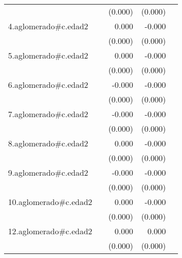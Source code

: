 {\begin{longtable}{l*{4}{D{.}{.}{-1}}}
            &                     &     (0.000)         &     (0.000)         &                     \\
\addlinespace
4.aglomerado#c.edad2&                     &       0.000         &      -0.000\sym{**} &                     \\
            &                     &     (0.000)         &     (0.000)         &                     \\
\addlinespace
5.aglomerado#c.edad2&                     &       0.000         &      -0.000         &                     \\
            &                     &     (0.000)         &     (0.000)         &                     \\
\addlinespace
6.aglomerado#c.edad2&                     &      -0.000         &      -0.000\sym{***}&                     \\
            &                     &     (0.000)         &     (0.000)         &                     \\
\addlinespace
7.aglomerado#c.edad2&                     &      -0.000         &      -0.000\sym{**} &                     \\
            &                     &     (0.000)         &     (0.000)         &                     \\
\addlinespace
8.aglomerado#c.edad2&                     &       0.000         &      -0.000         &                     \\
            &                     &     (0.000)         &     (0.000)         &                     \\
\addlinespace
9.aglomerado#c.edad2&                     &      -0.000         &      -0.000\sym{*}  &                     \\
            &                     &     (0.000)         &     (0.000)         &                     \\
\addlinespace
10.aglomerado#c.edad2&                     &       0.000         &      -0.000         &                     \\
            &                     &     (0.000)         &     (0.000)         &                     \\
\addlinespace
12.aglomerado#c.edad2&                     &       0.000         &       0.000         &                     \\
            &                     &     (0.000)         &     (0.000)         &                     \\

\end{longtable}}
